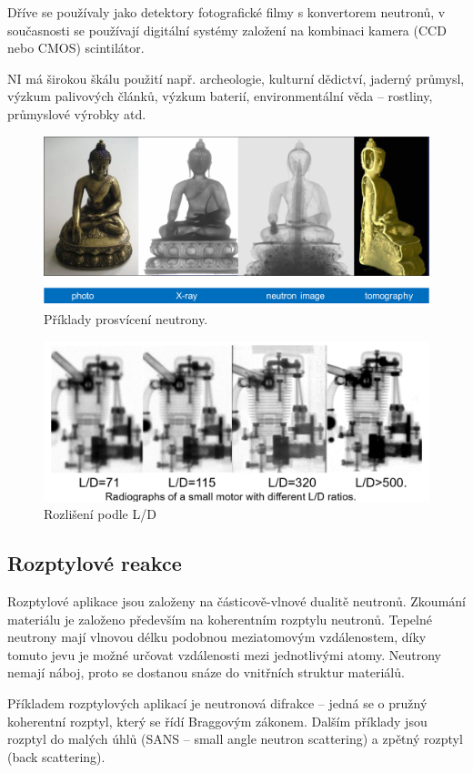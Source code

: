 Dříve se používaly jako detektory fotografické filmy s konvertorem neutronů, v současnosti se používají digitální systémy založení na kombinaci kamera (CCD nebo CMOS) scintilátor. 

NI má širokou škálu použití např. archeologie, kulturní dědictví, jaderný průmysl, výzkum palivových článků, výzkum baterií, environmentální věda -- rostliny, průmyslové výrobky atd.

\begin{figure}[H]
    \centering
    \includegraphics[width=0.7\linewidth]{img/Zobrazování.png}
    \caption{Příklady prosvícení neutrony.}
    \label{fig:Zobra}
\end{figure}

\begin{figure}
    \centering
    \includegraphics[width=0.5\linewidth]{img/RozlišeníPodleLD.png}
    \caption{Rozlišení podle L/D}
    \label{fig:enter-label}
\end{figure}

\subsection{Rozptylové reakce}

Rozptylové aplikace jsou založeny na částicově-vlnové dualitě neutronů. Zkoumání materiálu je založeno především na koherentním rozptylu neutronů. Tepelné neutrony mají vlnovou délku podobnou meziatomovým vzdálenostem, díky tomuto jevu je možné určovat vzdálenosti mezi jednotlivými atomy. Neutrony nemají náboj, proto se dostanou snáze do vnitřních struktur materiálů. 

Příkladem rozptylových aplikací je neutronová difrakce -- jedná se o pružný koherentní rozptyl, který se řídí Braggovým zákonem. Dalším příklady jsou rozptyl do malých úhlů (SANS -- small angle neutron scattering) a zpětný rozptyl (back scattering). 

